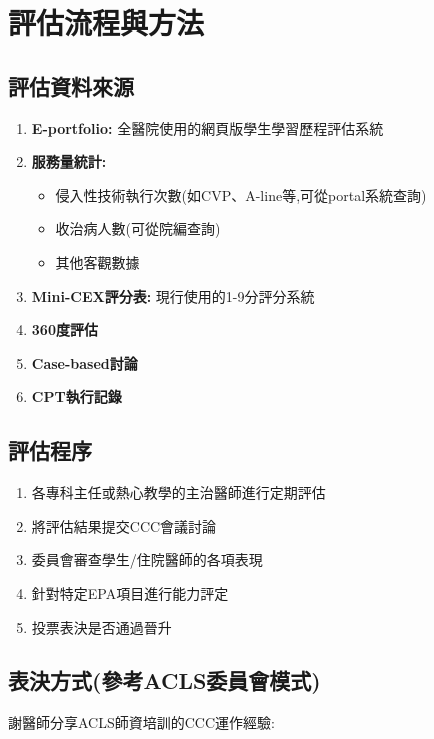 \documentclass[12pt,a4paper]{article}
\begin{document}
\section{評估流程與方法}

\subsection{評估資料來源}

\begin{enumerate}[leftmargin=*]
    \item \textbf{E-portfolio:} 全醫院使用的網頁版學生學習歷程評估系統
    \item \textbf{服務量統計:}
    \begin{itemize}
        \item 侵入性技術執行次數(如CVP、A-line等,可從portal系統查詢)
        \item 收治病人數(可從院編查詢)
        \item 其他客觀數據
    \end{itemize}
    \item \textbf{Mini-CEX評分表:} 現行使用的1-9分評分系統
    \item \textbf{360度評估}
    \item \textbf{Case-based討論}
    \item \textbf{CPT執行記錄}
\end{enumerate}

\subsection{評估程序}

\begin{enumerate}[leftmargin=*]
    \item 各專科主任或熱心教學的主治醫師進行定期評估
    \item 將評估結果提交CCC會議討論
    \item 委員會審查學生/住院醫師的各項表現
    \item 針對特定EPA項目進行能力評定
    \item 投票表決是否通過晉升
\end{enumerate}

\subsection{表決方式(參考ACLS委員會模式)}

謝醫師分享ACLS師資培訓的CCC運作經驗:
\end{document}
